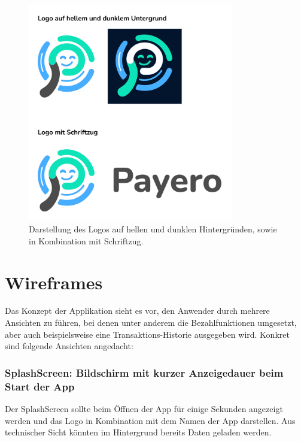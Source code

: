 \begin{figure}[H]
  \centering
  \includegraphics[width=0.8\textwidth]{images/branding.png}
  \caption{Darstellung des Logos auf hellen und dunklen Hintergründen, sowie in Kombination mit Schriftzug.}
  \label{branding}
\end{figure}

  \section{Wireframes}

  Das Konzept der Applikation sieht es vor, den Anwender durch mehrere Ansichten zu führen, bei denen unter anderem die Bezahlfunktionen umgesetzt, aber auch beispielsweise eine Transaktions-Historie ausgegeben wird.
  Konkret sind folgende Ansichten angedacht:

  \subsubsection*{SplashScreen: Bildschirm mit kurzer Anzeigedauer beim Start der App}
  Der SplashScreen sollte beim Öffnen der App für einige Sekunden angezeigt werden und das Logo in Kombination mit dem Namen der App darstellen.
  Aus technischer Sicht könnten im Hintergrund bereits Daten geladen werden.

